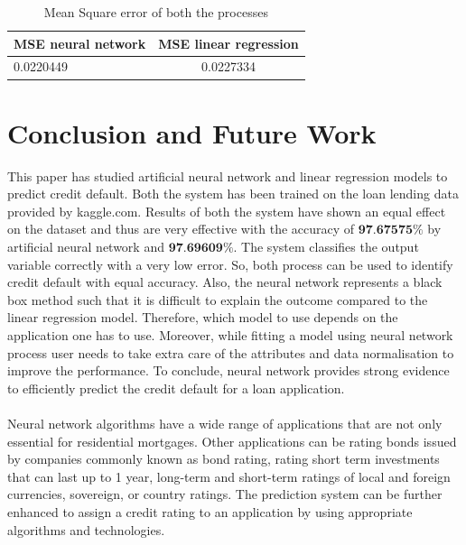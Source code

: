 \documentclass{article}[]
\begin{document}
\begin{table}[!htb] 
\caption{Mean Square error of both the processes} %
\centering      %
\begin{tabular}{l|c}  %
\hline                      %
{\bf MSE neural network}&{\bf MSE linear regression}\\
\hline                    %
0.0220449 & 0.0227334\\
\hline     %
\end{tabular} 
\label{table:mse} 
\end{table}

\section{Conclusion and Future Work}
This paper has studied artificial neural network and linear regression models to predict credit default. Both the system has been trained on the loan lending data provided by kaggle.com. Results of both the system have shown an equal effect on the dataset and thus are very effective with the accuracy of $\textbf{97.67575\%}$ by artificial neural network and $\textbf{97.69609\%}$. The system classifies the output variable correctly with a very low error. So, both process can be used to identify credit default with equal accuracy. Also, the neural network represents a black box method such that it is difficult to explain the outcome compared to the linear regression model. Therefore, which model to use depends on the application one has to use. Moreover, while fitting a model using neural network process user needs to take extra care of the attributes and data normalisation to improve the performance. To conclude, neural network provides strong evidence to efficiently predict the credit default for a loan application.\\\\
Neural network algorithms have a wide range of applications that are not only essential for residential mortgages. Other applications can be rating bonds issued by companies commonly known as bond rating, rating short term investments that can last up to 1 year, long-term and short-term ratings of local and foreign currencies, sovereign, or country ratings. The prediction system can be further enhanced to assign a credit rating to an application by using appropriate algorithms and technologies.


 
\end{document}
